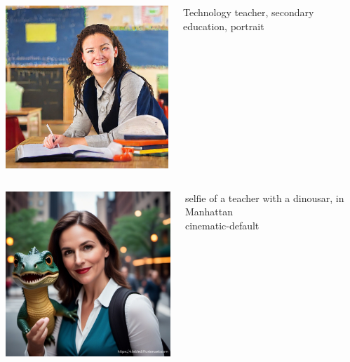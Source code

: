 \documentclass[17pt,aspectratio=169,hyperref={pdfusetitle,colorlinks,allcolors=olive}]{beamer}
\begin{document}
\begin{frame}[fragile]

    \begin{columns}[T]
    \begin{column}{.58\textwidth}
        \includegraphics[width=7.5cm]{figs/sd-teacher-tech}
    \end{column}%
    \hfill%
    \begin{column}{.38\textwidth}
      Technology teacher, secondary education, portrait
    \end{column}%
  \end{columns}

\end{frame}

\begin{frame}[fragile]

    \begin{columns}[T]
    \begin{column}{.58\textwidth}
        \includegraphics[width=7.5cm]{figs/selfie}
    \end{column}%
    \hfill%
    \begin{column}{.38\textwidth}
      selfie of a teacher with a dinousar, in Manhattan \\
      cinematic-default \\
    \end{column}%
  \end{columns}

\end{frame}
\end{document}

